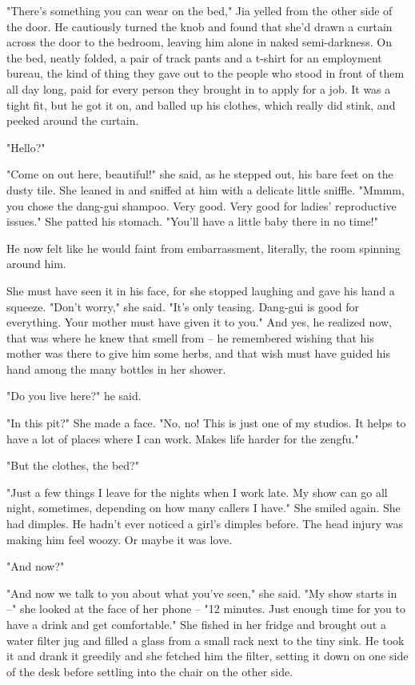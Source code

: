 "There's something you can wear on the bed," Jia yelled from the
other side of the door. He cautiously turned the knob and found
that she'd drawn a curtain across the door to the bedroom, leaving
him alone in naked semi-darkness. On the bed, neatly folded, a pair
of track pants and a t-shirt for an employment bureau, the kind of
thing they gave out to the people who stood in front of them all
day long, paid for every person they brought in to apply for a job.
It was a tight fit, but he got it on, and balled up his clothes,
which really did stink, and peeked around the curtain.

"Hello?"

"Come on out here, beautiful!" she said, as he stepped out, his
bare feet on the dusty tile. She leaned in and sniffed at him with
a delicate little sniffle. "Mmmm, you chose the dang-gui shampoo.
Very good. Very good for ladies' reproductive issues." She patted
his stomach. "You'll have a little baby there in no time!"

He now felt like he would faint from embarrassment, literally, the
room spinning around him.

She must have seen it in his face, for she stopped laughing and
gave his hand a squeeze. "Don't worry," she said. "It's only
teasing. Dang-gui is good for everything. Your mother must have
given it to you." And yes, he realized now, that was where he knew
that smell from -- he remembered wishing that his mother was there
to give him some herbs, and that wish must have guided his hand
among the many bottles in her shower.

"Do you live here?" he said.

"In this pit?" She made a face. "No, no! This is just one of my
studios. It helps to have a lot of places where I can work. Makes
life harder for the zengfu."

"But the clothes, the bed?"

"Just a few things I leave for the nights when I work late. My show
can go all night, sometimes, depending on how many callers I have."
She smiled again. She had dimples. He hadn't ever noticed a girl's
dimples before. The head injury was making him feel woozy. Or maybe
it was love.

"And now?"

"And now we talk to you about what you've seen," she said. "My show
starts in --" she looked at the face of her phone -- "12 minutes.
Just enough time for you to have a drink and get comfortable." She
fished in her fridge and brought out a water filter jug and filled
a glass from a small rack next to the tiny sink. He took it and
drank it greedily and she fetched him the filter, setting it down
on one side of the desk before settling into the chair on the other
side.

